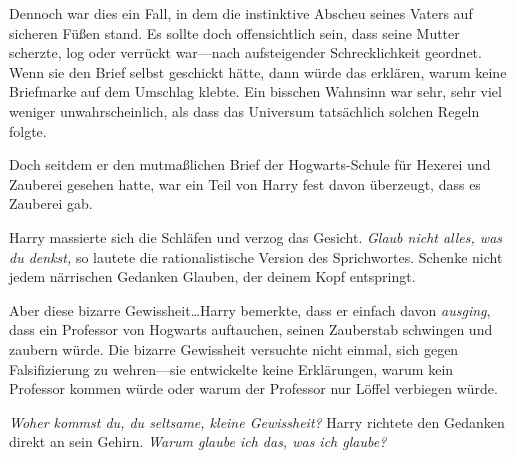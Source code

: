 Dennoch war dies ein Fall, in dem die instinktive Abscheu seines Vaters auf sicheren Füßen stand. Es sollte doch offensichtlich sein, dass seine Mutter scherzte, log oder verrückt war—nach aufsteigender Schrecklichkeit geordnet. Wenn sie den Brief selbst geschickt hätte, dann würde das erklären, warum keine Briefmarke auf dem Umschlag klebte. Ein bisschen Wahnsinn war sehr, sehr viel weniger unwahrscheinlich, als dass das Universum tatsächlich solchen Regeln folgte.

Doch seitdem er den mutmaßlichen Brief der Hogwarts-Schule für Hexerei und Zauberei gesehen hatte, war ein Teil von Harry fest davon überzeugt, dass es Zauberei gab.

Harry massierte sich die Schläfen und verzog das Gesicht. \emph{Glaub nicht alles, was du denkst,} so lautete die rationalistische Version des Sprichwortes. Schenke nicht jedem närrischen Gedanken Glauben, der deinem Kopf entspringt.

Aber diese bizarre Gewissheit…Harry bemerkte, dass er einfach davon \emph{ausging}, dass ein Professor von Hogwarts auftauchen, seinen Zauberstab schwingen und zaubern würde. Die bizarre Gewissheit versuchte nicht einmal, sich gegen Falsifizierung zu wehren—sie entwickelte keine Erklärungen, warum kein Professor kommen würde oder warum der Professor nur Löffel verbiegen würde.

\emph{Woher kommst du, du seltsame, kleine Gewissheit?} Harry richtete den Gedanken direkt an sein Gehirn. \emph{Warum glaube ich das, was ich glaube?}

